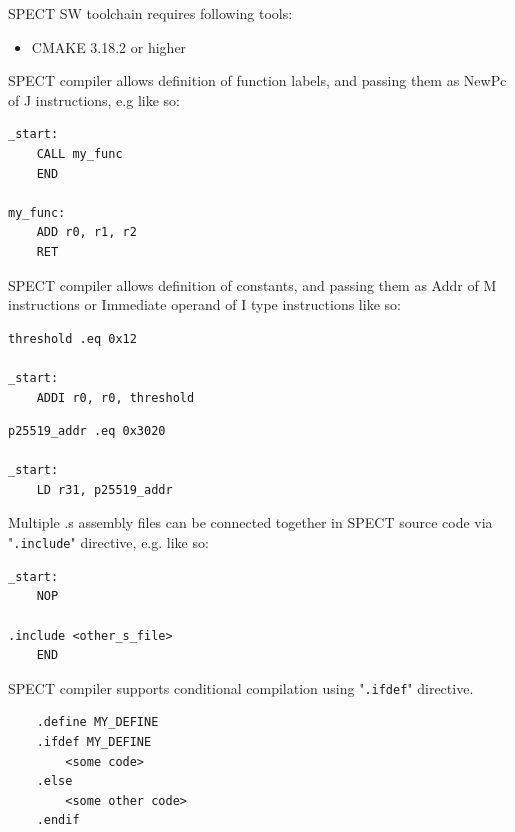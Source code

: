\documentclass[notconfidential]{tropic_design_spec}
\begin{document}

SPECT SW toolchain requires following tools:
\begin{itemize}
    \item CMAKE 3.18.2 or higher
\end{itemize}


SPECT compiler allows definition of function labels, and passing them
as NewPc of J instructions, e.g like so:

\begin{lstlisting}
_start:
    CALL my_func
    END

my_func:
    ADD r0, r1, r2
    RET
\end{lstlisting}


SPECT compiler allows definition of constants, and passing them as
Addr of M instructions or Immediate operand of I type instructions like so:

\begin{lstlisting}
threshold .eq 0x12

_start:
    ADDI r0, r0, threshold
\end{lstlisting}

\begin{lstlisting}
p25519_addr .eq 0x3020

_start:
    LD r31, p25519_addr
\end{lstlisting}



Multiple .s assembly files can be connected together in SPECT source code
via "\texttt{.include}" directive, e.g. like so:

\begin{lstlisting}
_start:
    NOP

.include <other_s_file>
    END
\end{lstlisting}


SPECT compiler supports conditional compilation using "\texttt{.ifdef}" directive.

\begin{lstlisting}
    .define MY_DEFINE
    .ifdef MY_DEFINE
        <some code>
    .else
        <some other code>
    .endif
\end{lstlisting}
\end{document}
